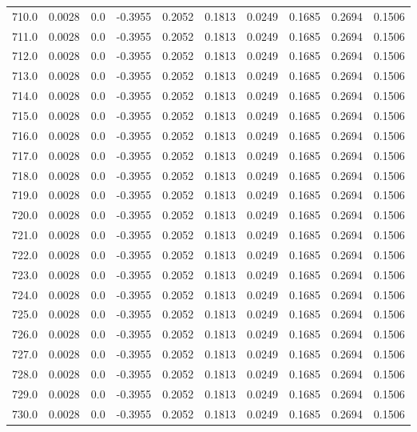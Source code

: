 \begin{longtable}{lrrrrrrrrr}
710.0 & 0.0028 & 0.0 & -0.3955 & 0.2052 & 0.1813 & 0.0249 & 0.1685 & 0.2694 & 0.1506 \\
711.0 & 0.0028 & 0.0 & -0.3955 & 0.2052 & 0.1813 & 0.0249 & 0.1685 & 0.2694 & 0.1506 \\
712.0 & 0.0028 & 0.0 & -0.3955 & 0.2052 & 0.1813 & 0.0249 & 0.1685 & 0.2694 & 0.1506 \\
713.0 & 0.0028 & 0.0 & -0.3955 & 0.2052 & 0.1813 & 0.0249 & 0.1685 & 0.2694 & 0.1506 \\
714.0 & 0.0028 & 0.0 & -0.3955 & 0.2052 & 0.1813 & 0.0249 & 0.1685 & 0.2694 & 0.1506 \\
715.0 & 0.0028 & 0.0 & -0.3955 & 0.2052 & 0.1813 & 0.0249 & 0.1685 & 0.2694 & 0.1506 \\
716.0 & 0.0028 & 0.0 & -0.3955 & 0.2052 & 0.1813 & 0.0249 & 0.1685 & 0.2694 & 0.1506 \\
717.0 & 0.0028 & 0.0 & -0.3955 & 0.2052 & 0.1813 & 0.0249 & 0.1685 & 0.2694 & 0.1506 \\
718.0 & 0.0028 & 0.0 & -0.3955 & 0.2052 & 0.1813 & 0.0249 & 0.1685 & 0.2694 & 0.1506 \\
719.0 & 0.0028 & 0.0 & -0.3955 & 0.2052 & 0.1813 & 0.0249 & 0.1685 & 0.2694 & 0.1506 \\
720.0 & 0.0028 & 0.0 & -0.3955 & 0.2052 & 0.1813 & 0.0249 & 0.1685 & 0.2694 & 0.1506 \\
721.0 & 0.0028 & 0.0 & -0.3955 & 0.2052 & 0.1813 & 0.0249 & 0.1685 & 0.2694 & 0.1506 \\
722.0 & 0.0028 & 0.0 & -0.3955 & 0.2052 & 0.1813 & 0.0249 & 0.1685 & 0.2694 & 0.1506 \\
723.0 & 0.0028 & 0.0 & -0.3955 & 0.2052 & 0.1813 & 0.0249 & 0.1685 & 0.2694 & 0.1506 \\
724.0 & 0.0028 & 0.0 & -0.3955 & 0.2052 & 0.1813 & 0.0249 & 0.1685 & 0.2694 & 0.1506 \\
725.0 & 0.0028 & 0.0 & -0.3955 & 0.2052 & 0.1813 & 0.0249 & 0.1685 & 0.2694 & 0.1506 \\
726.0 & 0.0028 & 0.0 & -0.3955 & 0.2052 & 0.1813 & 0.0249 & 0.1685 & 0.2694 & 0.1506 \\
727.0 & 0.0028 & 0.0 & -0.3955 & 0.2052 & 0.1813 & 0.0249 & 0.1685 & 0.2694 & 0.1506 \\
728.0 & 0.0028 & 0.0 & -0.3955 & 0.2052 & 0.1813 & 0.0249 & 0.1685 & 0.2694 & 0.1506 \\
729.0 & 0.0028 & 0.0 & -0.3955 & 0.2052 & 0.1813 & 0.0249 & 0.1685 & 0.2694 & 0.1506 \\
730.0 & 0.0028 & 0.0 & -0.3955 & 0.2052 & 0.1813 & 0.0249 & 0.1685 & 0.2694 & 0.1506 \\

\end{longtable}
